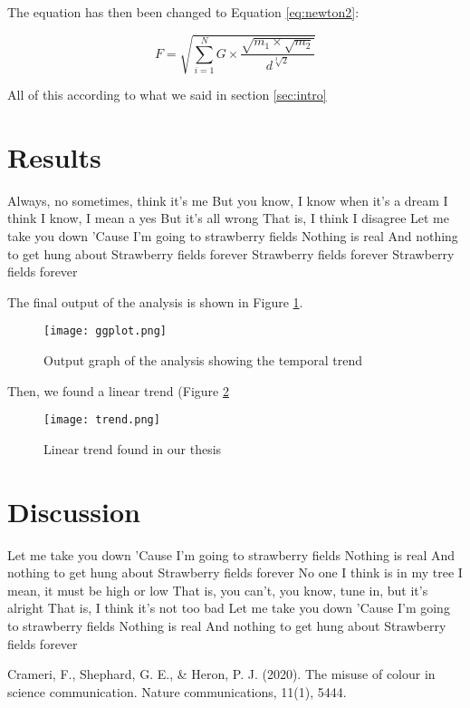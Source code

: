 \documentclass{article}
\begin{document}
The equation has then been changed to Equation \ref{eq:newton2}:

\begin{equation}
F = \sqrt{\sum_{i=1}^{N} G \times \frac{\sqrt{m_1 \times \sqrt{m_2}}}{d^{\sqrt[3]{2}}}}
\label{eq:newton2}
\end{equation}

All of this according to what we said in section \ref{sec:intro}

\section{Results}

Always, no sometimes, think it's me
But you know, I know when it's a dream
I think I know, I mean a yes
But it's all wrong
That is, I think I disagree
Let me take you down
'Cause I'm going to strawberry fields
Nothing is real
And nothing to get hung about
Strawberry fields forever
Strawberry fields forever
Strawberry fields forever

The final output of the analysis is shown in Figure \ref{fig:temporal}.

\begin{figure}
    \centering
    \texttt{[image: ggplot.png]}
    \caption{Output graph of the analysis showing the temporal trend}
    \label{fig:temporal}
\end{figure}

Then, we found a linear trend (Figure \ref{fig:trend}

\begin{figure}
    \centering
    \texttt{[image: trend.png]}
    \caption{Linear trend found in our thesis}
    \label{fig:trend}
\end{figure}

\section{Discussion}
Let me take you down
'Cause I'm going to strawberry fields
Nothing is real
And nothing to get hung about
Strawberry fields forever
No one I think is in my tree
I mean, it must be high or low
That is, you can't, you know, tune in, but it's alright
That is, I think it's not too bad
Let me take you down
'Cause I'm going to strawberry fields
Nothing is real
And nothing to get hung about
Strawberry fields forever \cite{crameri}

\begin{thebibliography}{999}
Crameri, F., Shephard, G. E., \& Heron, P. J. (2020). The misuse of colour in science communication. Nature communications, 11(1), 5444.
\end{thebibliography}
\end{document}
